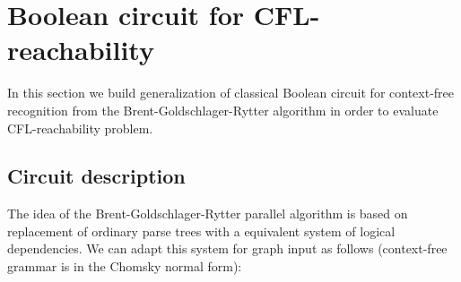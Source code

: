 \section{Boolean circuit for CFL-reachability}
\label{sec:circuit}
In this section we build generalization of classical Boolean circuit for context-free recognition from the Brent-Goldschlager-Rytter algorithm \cite*{Brent, Rytter} in order to evaluate CFL-reachability problem.
\subsection{Circuit description}
\label{Bdesc}
The idea of the Brent-Goldschlager-Rytter parallel algorithm is based on replacement of ordinary parse trees with a equivalent system of logical dependencies. We can adapt this system for graph input as follows (context-free grammar is in the Chomsky normal form):
